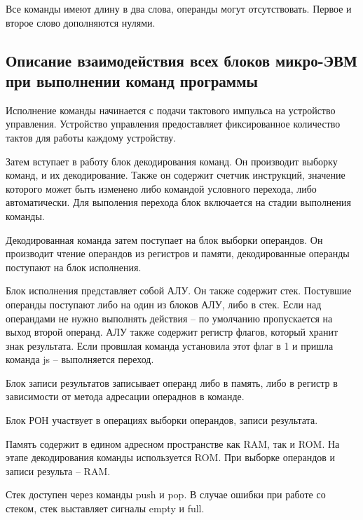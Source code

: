 Все команды имеют длину в два слова, операнды могут отсутствовать.
Первое и второе слово дополняются нулями.

\subsection{Описание взаимодействия всех блоков микро-ЭВМ при выполнении команд программы}
Исполнение команды начинается с подачи тактового импульса на устройство управления. Устройство управления предоставляет фиксированное количество тактов для работы каждому устройству.

Затем вступает в работу блок декодирования команд. Он производит выборку команд, и их декодирование. Также он содержит счетчик инструкций, значение которого может быть изменено либо командой условного перехода, либо автоматически. Для выполения перехода блок включается на стадии выполнения команды.

Декодированная команда затем поступает на блок выборки операндов. Он производит чтение операндов из регистров и памяти, декодированные операнды поступают на блок исполнения.

Блок исполнения представляет собой АЛУ. Он также содержит стек. Постувшие операнды поступают либо на один из блоков АЛУ, либо в стек. Если над операндами не нужно выполнять действия -- по умолчанию пропускается на выход второй операнд. АЛУ также содержит регистр флагов, который хранит знак результата. Если провшлая команда установила этот флаг в 1 и пришла команда js -- выполняется переход.

Блок записи результатов записывает операнд либо в память, либо в регистр в зависимости от метода адресации операднов в команде.

Блок РОН участвует в операциях выборки операндов, записи результата.

Память содержит в едином адресном пространстве как RAM, так и ROM. На этапе декодирования команды используется ROM. При выборке операндов и записи результа -- RAM.

Стек доступен через команды push и pop. В случае ошибки при работе со стеком, стек выставляет сигналы empty и full.
